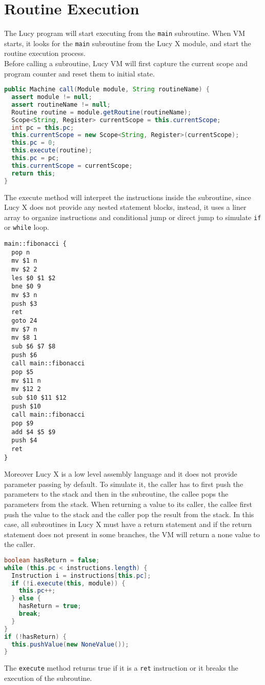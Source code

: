 \section{Routine Execution}
The Lucy program will start executing from the \texttt{main} subroutine. When VM starts, it looks for the \texttt{main} subroutine from the Lucy X module, and start the routine execution process. \\
Before calling a subroutine, Lucy VM will first capture the current scope and program counter and reset them to initial state.
\begin{lstlisting}[language=java]
public Machine call(Module module, String routineName) {
  assert module != null;
  assert routineName != null;
  Routine routine = module.getRoutine(routineName);
  Scope<String, Register> currentScope = this.currentScope;
  int pc = this.pc;
  this.currentScope = new Scope<String, Register>(currentScope);
  this.pc = 0;
  this.execute(routine);
  this.pc = pc;
  this.currentScope = currentScope;
  return this;
}
\end{lstlisting}
The execute method will interpret the instructions inside the subroutine, since Lucy X does not provide any nested statement blocks, instead, it uses a liner array to organize instructions and conditional jump or direct jump to simulate \texttt{if} or \texttt{while} loop.
\begin{lstlisting}[language=LucyX]
main::fibonacci {
  pop n
  mv $1 n
  mv $2 2
  les $0 $1 $2
  bne $0 9
  mv $3 n
  push $3
  ret
  goto 24
  mv $7 n
  mv $8 1
  sub $6 $7 $8
  push $6
  call main::fibonacci
  pop $5
  mv $11 n
  mv $12 2
  sub $10 $11 $12
  push $10
  call main::fibonacci
  pop $9
  add $4 $5 $9
  push $4
  ret
}
\end{lstlisting}
Moreover Lucy X is a low level assembly language and it does not provide parameter passing by default. To simulate it, the caller has to first push the parameters to the stack and then in the subroutine, the callee pops the parameters from the stack. When returning a value to its caller, the callee first push the value to the stack and the caller pop the result from the stack. In this case, all subroutines in Lucy X must have a return statement and if the return statement does not present in some branches, the VM will return a none value to the caller.
\begin{lstlisting}[language=java]
boolean hasReturn = false;
while (this.pc < instructions.length) {
  Instruction i = instructions[this.pc];
  if (!i.execute(this, module)) {
    this.pc++;
  } else {
    hasReturn = true;
    break;
  }
}
if (!hasReturn) {
  this.pushValue(new NoneValue());
}
\end{lstlisting}
The \texttt{execute} method returns true if it is a \texttt{ret} instruction or it breaks the execution of the subroutine.

